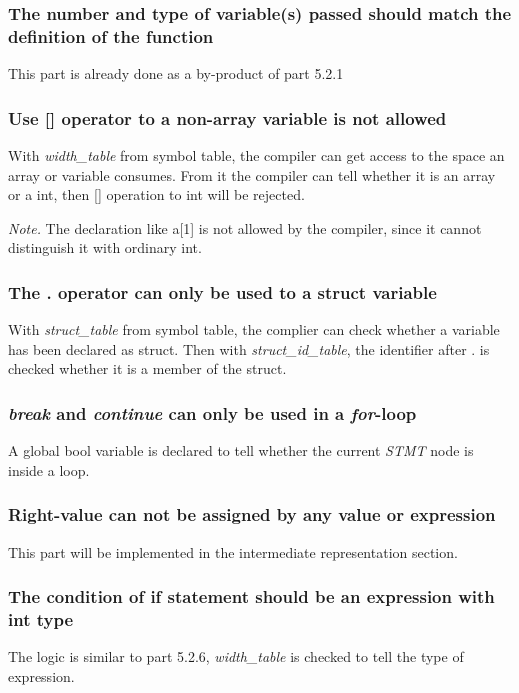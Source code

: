 \documentclass{article}
\begin{document}
\subsubsection{The number and type of variable(s) passed should match the definition of the function}
This part is already done as a by-product of part 5.2.1

\subsubsection{Use [] operator to a non-array variable is not allowed}

With \textit{width\_table} from symbol table, the compiler can get access to the space an array or variable consumes. From it the compiler can tell whether it is an array or a int, then [] operation to int will be rejected.

\textit{Note.} The declaration like a[1] is not allowed by the compiler, since it cannot distinguish it with ordinary int.

\subsubsection{The . operator can only be used to a struct variable}
With \textit{struct\_table} from symbol table, the complier can check whether a variable has been declared as struct. Then with \textit{struct\_id\_table}, the identifier after . is checked whether it is a member of the struct.

\subsubsection{\textit{break} and \textit{continue} can only be used in a \textit{for}-loop}
A global bool variable is declared to tell whether the current \textit{STMT} node is inside a loop.

\subsubsection{Right-value can not be assigned by any value or expression}
This part will be implemented in the intermediate representation section.

\subsubsection{The condition of if statement should be an expression with int type}
The logic is similar to part 5.2.6, \textit{width\_table} is checked to tell the type of expression. 
\end{document}
